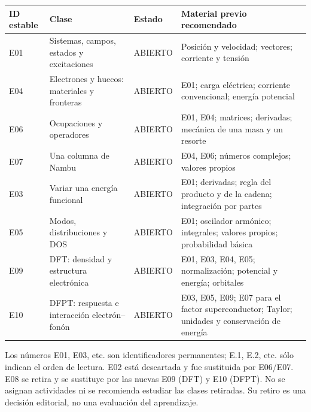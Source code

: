 \documentclass[
  spanish,
  10pt,
  a4paper,
]{article}
\newcounter{none} %
\begin{document}
{\def\LTcaptype{none} %
\begin{longtable}[]{@{}
  >{\raggedright\arraybackslash}p{}
  >{\raggedright\arraybackslash}p{}
  >{\raggedright\arraybackslash}p{}
  >{\raggedright\arraybackslash}p{}@{}}
\toprule\noalign{}
\begin{minipage}[b]{\linewidth}\raggedright
ID estable
\end{minipage} & \begin{minipage}[b]{\linewidth}\raggedright
Clase
\end{minipage} & \begin{minipage}[b]{\linewidth}\raggedright
Estado
\end{minipage} & \begin{minipage}[b]{\linewidth}\raggedright
Material previo recomendado
\end{minipage} \\
\midrule\noalign{}
\endhead
\bottomrule\noalign{}
\endlastfoot
E01 & Sistemas, campos, estados y excitaciones & ABIERTO & Posición y
velocidad; vectores; corriente y tensión \\
E04 & Electrones y huecos: materiales y fronteras & ABIERTO & E01; carga
eléctrica; corriente convencional; energía potencial \\
E06 & Ocupaciones y operadores & ABIERTO & E01, E04; matrices;
derivadas; mecánica de una masa y un resorte \\
E07 & Una columna de Nambu & ABIERTO & E04, E06; números complejos;
valores propios \\
E03 & Variar una energía funcional & ABIERTO & E01; derivadas; regla del
producto y de la cadena; integración por partes \\
E05 & Modos, distribuciones y DOS & ABIERTO & E01; oscilador armónico;
integrales; valores propios; probabilidad básica \\
E09 & DFT: densidad y estructura electrónica & ABIERTO & E01, E03, E04,
E05; normalización; potencial y energía; orbitales \\
E10 & DFPT: respuesta e interacción electrón--fonón & ABIERTO & E03,
E05, E09; E07 para el factor superconductor; Taylor; unidades y
conservación de energía \\
\end{longtable}
}

Los números E01, E03, etc. son identificadores permanentes; E.1, E.2,
etc. sólo indican el orden de lectura. E02 está descartada y fue
sustituida por E06/E07. E08 se retira y se sustituye por las nuevas E09
(DFT) y E10 (DFPT). No se asignan actividades ni se recomienda estudiar
las clases retiradas. Su retiro es una decisión editorial, no una
evaluación del aprendizaje.
\end{document}
